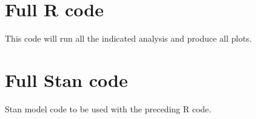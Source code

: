\section{Full R code}

	This code will run all the indicated analysis and produce all plots.

	

\section{Full Stan code}

	Stan model code to be used with the preceding R code.

	